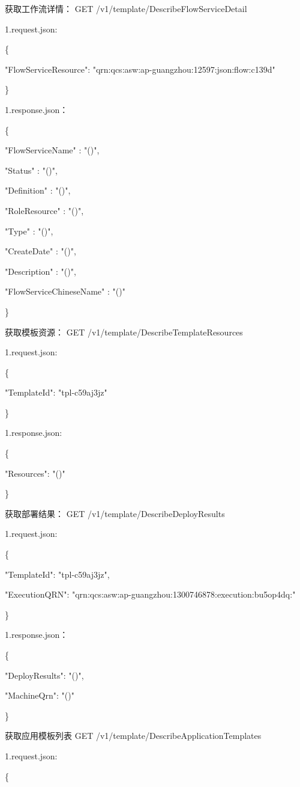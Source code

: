 获取工作流详情：
GET /v1/template/DescribeFlowServiceDetail


1.request.json:

\{

"FlowServiceResource": "qrn:qcs:asw:ap-guangzhou:12597:json:flow:c139d"

\}

1.response.json：

\{

"FlowServiceName"        :  "\@notEmpty()",

"Status"                 :  "\@notEmpty()",

"Definition"             :  "\@notEmpty()",

"RoleResource"           :  "\@notEmpty()",

"Type"                   :  "\@notEmpty()",

"CreateDate"             :  "\@notEmpty()",

"Description"            :  "\@notEmpty()",

"FlowServiceChineseName" :  "\@exists()"

\}

获取模板资源：
GET /v1/template/DescribeTemplateResources

1.request.json:

\{

"TemplateId": "tpl-c59aj3jz"

\}

1.response.json:

\{

"Resources": "\@exists()"

\}

获取部署结果：
GET /v1/template/DescribeDeployResults

1.request.json:

\{

"TemplateId": "tpl-c59aj3jz",

"ExecutionQRN": "qrn:qcs:asw:ap-guangzhou:1300746878:execution:bu5op4dq:"

\}

1.response.json：

\{

"DeployResults": "\@exists()",

"MachineQrn": "\@len()"

\}

获取应用模板列表
GET /v1/template/DescribeApplicationTemplates

1.request.json:

\{

